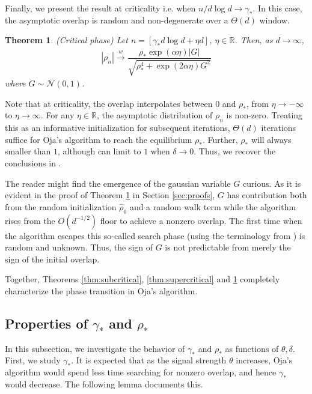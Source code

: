 \documentclass[12pt]{article}
\newtheorem{theorem}{Theorem}[section]  %
\def\gN{{\mathcal{N}}}
\def\sR{{\mathbb{R}}}
\begin{document}
\medskip

Finally, we present the result at criticality i.e. when $n/d\log d\to \gamma_*$. In this case, the asymptotic overlap is random and non-degenerate over a $\Theta(d)$ window.
\begin{theorem}\label{thm:critical}(Critical phase)
    Let $n=[\gamma_*d\log d+\eta d]$, $\eta\in\sR$. Then, as $d\to\infty$,
    \begin{align*}
        |\rho_n| \stackrel{w}{\to} \dfrac{\rho_*\exp(\alpha\eta)|G|}{\sqrt{\rho_*^4 + \exp(2\alpha\eta) G^2}}
    \end{align*} where $G\sim\gN(0,1)$.
\end{theorem}


Note that at criticality, the overlap interpolates between $0$ and $\rho_*$, from $\eta\to-\infty$ to $\eta\to\infty$. For any $\eta\in\sR$, the asymptotic distribution of $\rho_n$ is non-zero. Treating this as an informative initialization for subsequent iterations, $\Theta(d)$ iterations suffice for Oja's algorithm to reach the equilibrium $\rho_*$. Further, $\rho_*$ will always smaller than $1$, although can limit to $1$ when $\delta\to 0$. Thus, we recover the conclusions in \citet{wang2016online}.

\medskip

The reader might find the emergence of the gaussian variable $G$ curious. As it is evident in the proof of Theorem \ref{thm:critical} in Section \ref{sec:proofs}, $G$ has contribution both from the random initialization $\hat\rho_0$ and a random walk term while the algorithm rises from the $O(d^{-1/2})$ floor to achieve a nonzero overlap. The first time when the algorithm escapes this so-called search phase (using the terminology from \citet{arous2021online}) is random and unknown. Thus, the sign of $G$ is not predictable from merely the sign of the initial overlap.

\medskip

Together, Theorems \ref{thm:subcritical}, \ref{thm:supercritical} and \ref{thm:critical} completely characterize the phase transition in Oja's algorithm.

\subsection{Properties of $\gamma_*$ and $\rho_*$}

In this subsection, we investigate the behavior of $\gamma_*$ and $\rho_*$ as functions of $\theta,\delta$. First, we study $\gamma_*$. It is expected that as the signal strength $\theta$ increases, Oja's algorithm would spend less time searching for nonzero overlap, and hence $\gamma_*$ would decrease. The following lemma documents this.
\end{document}
